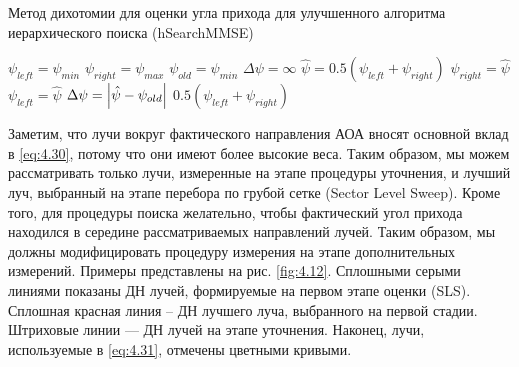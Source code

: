 \begin{algorithm}
    \caption{Метод дихотомии для оценки угла прихода для улучшенного алгоритма иерархического поиска (hSearchMMSE)}
    \label{lst:4.1}
    \begin{algorithmic}
        \State $\psi_{left} = \psi_{min}$
        \State $\psi_{right} = \psi_{max}$
        \State $\psi_{old} = \psi_{min}$
        \State $\Delta \psi = \infty$
        \While{$\Delta \psi > \epsilon$}
        \State $\hat \psi = 0.5 (\psi_{left} + \psi_{right})$
        \State $\psi_{right} = \hat\psi$
        \Else
        \State $\psi_{left} = \hat\psi$
        \EndIf
        \State $\Delta \psi = \abs{\hat \psi - \psi_{old}}$
        \EndWhile
        \State \Return $0.5(\psi_{left} + \psi_{right})$
    \end{algorithmic}
\end{algorithm}

Заметим, что лучи вокруг фактического направления АОА вносят основной вклад в
\eqref{eq:4.30}, потому что они имеют более высокие веса. Таким образом, мы
можем рассматривать только лучи, измеренные на этапе процедуры уточнения, и
лучший луч, выбранный на этапе перебора по грубой сетке (Sector Level Sweep). Кроме того, для
процедуры поиска желательно, чтобы фактический угол прихода находился в середине
рассматриваемых направлений лучей. Таким образом, мы должны модифицировать
процедуру измерения на этапе дополнительных измерений. Примеры
представлены на рис.  \ref{fig:4.12}.
Сплошными серыми линиями показаны ДН лучей, формируемые на первом этапе оценки
(SLS). Сплошная красная линия -- ДН лучшего луча,
выбранного на первой стадии. Штриховые линии — ДН лучей на этапе
уточнения. Наконец, лучи, используемые в \eqref{eq:4.31}, отмечены цветными кривыми.

